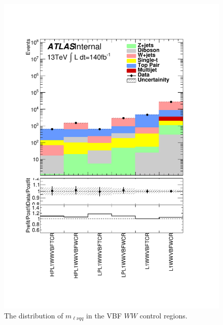 \begin{figure}[h!]
  \centering
  \includegraphics[width=\hsize]{figures/results/HVTWWVBF/PlotyieldTable_postfit.pdf}
 \caption{The distribution of $m_{\ell\nu qq}$ in the VBF $WW$ control regions.} 
  \label{fig:hvtwwvbf_cr_postfit}
\end{figure} 
\FloatBarrier

